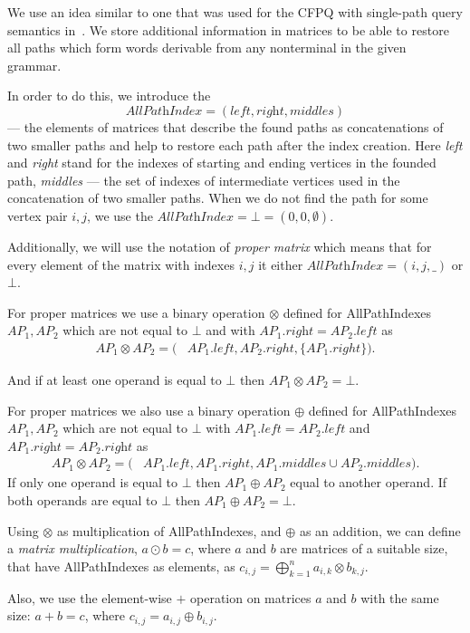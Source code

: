 We use an idea similar to one that was used for the CFPQ with single-path query semantics in~\cite{10.1145/3398682.3399163}. We store additional information in matrices to be able to restore all paths which form words derivable from any nonterminal in the given grammar.

In order to do this, we introduce the 
$$\textit{AllPathIndex} = (\textit{left},\textit{right},\textit{middles})$$ 
--- the elements of matrices that describe the found paths as concatenations of two smaller paths and help to restore each path after the index creation. Here \textit{left} and \textit{right} stand for the indexes of starting and ending vertices in the founded path, \textit{middles} --- the set of indexes of intermediate vertices used in the concatenation of two smaller paths. When we do not find the path for some vertex pair $i,j$, we use the $\textit{AllPathIndex} = \bot = (0,0,\emptyset)$.

Additionally, we will use the notation of \textit{proper matrix} which means that for every element of the matrix with indexes $i,j$ it either $\textit{AllPathIndex} = (i,j,\_)$ or $\bot$.

For proper matrices we use a binary operation $\otimes$ defined for AllPathIndexes \mbox{$AP_1, AP_2$} which are not equal to $\bot$ and with $AP_1.\textit{right} = AP_2.\textit{left}$ as
\begin{align*}
	AP_1 \otimes AP_2 = (&AP_1.left, AP_2.right, \{AP_1.right\}).
\end{align*}

And if at least one operand is equal to $\bot$ then $AP_1 \otimes AP_2 = \bot$.

For proper matrices we also use a binary operation $\oplus$ defined for AllPathIndexes \mbox{$AP_1, AP_2$} which are not equal to $\bot$ with $AP_1.\textit{left} = AP_2.\textit{left}$ and $AP_1.\textit{right} = AP_2.\textit{right}$ as
\begin{align*}
	AP_1 \otimes AP_2 = (&AP_1.left, AP_1.right, AP_1.middles \cup AP_2.middles).
\end{align*}
If only one operand is equal to $\bot$ then $AP_1 \oplus AP_2$ equal to another operand. If both operands are equal to $\bot$ then $AP_1 \oplus AP_2 = \bot$.

Using $\otimes$ as multiplication of AllPathIndexes, and $\oplus$ as an addition, we can define a \emph{matrix multiplication}, \mbox{$a \odot b = c$}, where $a$ and $b$ are matrices of a suitable size, that have AllPathIndexes as elements, as $c_{i,j} = \bigoplus^{n}_{k=1}{a_{i,k} \otimes b_{k,j}}.$

Also, we use the element-wise $+$ operation on matrices $a$ and $b$ with the same size: \mbox{$a + b = c$}, where $c_{i,j} = a_{i,j} \oplus b_{i,j}.$

